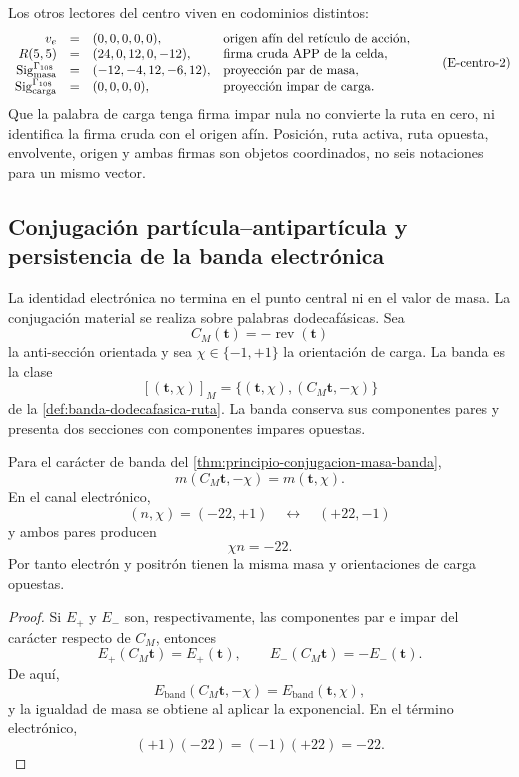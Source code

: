Los otros lectores del centro viven en codominios distintos:
\[
\begin{array}{rcll}
 v_e&=&(0,0,0,0,0),
   &\text{origen afín del retículo de acción},\\
 R(5,5)&=&(24,0,12,0,-12),
   &\text{firma cruda APP de la celda},\\
 \operatorname{Sig}^{\Gamma_{108}}_{\rm masa}
   &=&(-12,-4,12,-6,12),
   &\text{proyección par de masa},\\
 \operatorname{Sig}^{\Gamma_{108}}_{\rm carga}
   &=&(0,0,0,0),
   &\text{proyección impar de carga}.
\end{array}
\tag{E-centro-2}\label{eq:electron-firmas-tipadas-rev8}
\]
Que la palabra de carga tenga firma impar nula no convierte la ruta en
cero, ni identifica la firma cruda con el origen afín. Posición, ruta
activa, ruta opuesta, envolvente, origen y ambas firmas son objetos
coordinados, no seis notaciones para un mismo vector.

\subsection{Conjugación partícula–antipartícula y persistencia de la banda electrónica}

La identidad electrónica no termina en el punto central ni en el valor de
masa. La conjugación material se realiza sobre palabras dodecafásicas. Sea
\[
 C_M(\mathbf t)=-\operatorname{rev}(\mathbf t)
\]
la anti-sección orientada y sea
\(\chi\in\{-1,+1\}\) la orientación de carga. La banda es la clase
\[
 [(\mathbf t,\chi)]_M
 =
 \{(\mathbf t,\chi),(C_M\mathbf t,-\chi)\}
\]
de la \cref{def:banda-dodecafasica-ruta}. La banda conserva sus componentes
pares y presenta dos secciones con componentes impares opuestas.

\begin{theorem}
\label{thm:electron-positron-biografia-rev6}
Para el carácter de banda del
\cref{thm:principio-conjugacion-masa-banda},
\[
 m(C_M\mathbf t,-\chi)=m(\mathbf t,\chi).
\]
En el canal electrónico,
\[
 (n,\chi)=(-22,+1)
 \quad\longleftrightarrow\quad
 (+22,-1)
\]
y ambos pares producen
\[
 \chi n=-22.
\]
Por tanto electrón y positrón tienen la misma masa y orientaciones de
carga opuestas.
\end{theorem}

\begin{proof}
Si \(E_+\) y \(E_-\) son, respectivamente, las componentes par e impar del
carácter respecto de \(C_M\), entonces
\[
 E_+(C_M\mathbf t)=E_+(\mathbf t),
 \qquad
 E_-(C_M\mathbf t)=-E_-(\mathbf t).
\]
De aquí,
\[
 E_{\mathrm{band}}(C_M\mathbf t,-\chi)
 =
 E_{\mathrm{band}}(\mathbf t,\chi),
\]
y la igualdad de masa se obtiene al aplicar la exponencial. En el término
electrónico,
\[
 (+1)(-22)=(-1)(+22)=-22.
\]
\end{proof}

